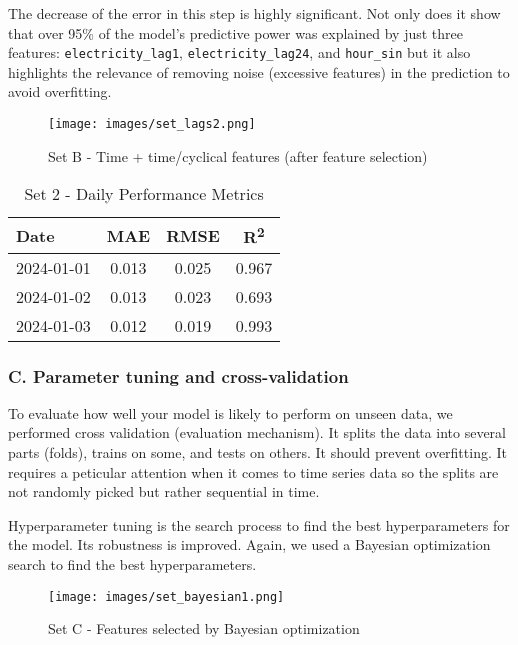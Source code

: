 The decrease of the error in this step is highly significant. Not only does it 
show that over 95\% of the model's predictive power was explained by just three 
features: \texttt{electricity\_lag1}, \texttt{electricity\_lag24}, and \texttt{hour\_sin} 
but it also highlights the relevance of removing noise (excessive features) in the prediction
to avoid overfitting. 

\begin{figure}[H]
    \centering
    \texttt{[image: images/set\_lags2.png]}
    \caption{Set B - Time + time/cyclical features (after feature selection)}
    \label{fig:set2-forecast-profile}
\end{figure}

\begin{table}[H]
    \centering
    \begin{tabular}{lccc}
        Date        & MAE    & RMSE   & R\textsuperscript{2} \\
        \hline
        2024-01-01  & 0.013  & 0.025  & 0.967 \\
        2024-01-02  & 0.013  & 0.023  & 0.693 \\
        2024-01-03  & 0.012  & 0.019  & 0.993 \\
    \end{tabular}
    \caption{Set 2 - Daily Performance Metrics}
\end{table}

\subsubsection*{C. Parameter tuning and cross-validation}
To evaluate how well your model is likely to perform on unseen data, we performed 
cross validation (evaluation mechanism). It splits the data into several parts (folds), 
trains on some, and tests on others. It should prevent overfitting. It requires a peticular
attention when it comes to time series data so the splits are not randomly picked but rather 
sequential in time.

Hyperparameter tuning is the search process to find the best hyperparameters for the model.
Its robustness is improved. Again, we used a Bayesian optimization search to find the 
best hyperparameters.

\begin{figure}[H]
    \centering
    \texttt{[image: images/set\_bayesian1.png]}
    \caption{Set C - Features selected by Bayesian optimization}
    \label{fig:set3-forecast-profile}
\end{figure}

